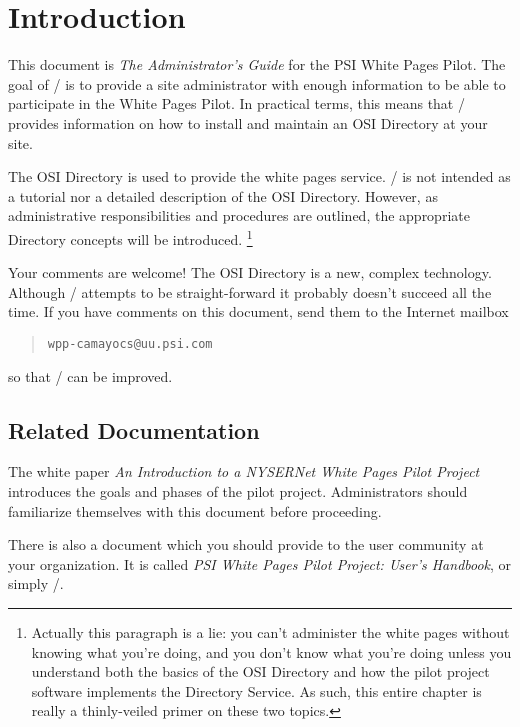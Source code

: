 
\chapter	{Introduction}
This document is {\em The Administrator's Guide\/} for the
PSI White Pages Pilot.
The goal of \theguide/ is to provide a site administrator
with enough information to be able to participate in the White Pages
Pilot.
In practical terms,
this means that \theguide/ provides information on how
to install and maintain an OSI Directory at your site.

The OSI Directory is used to provide the white pages service.
\theguide/ is not intended as a tutorial nor a detailed description
of the OSI Directory.
However, as administrative responsibilities and procedures are
outlined,
the appropriate Directory concepts will be introduced.%
\footnote{Actually this paragraph is a lie:
you can't administer the white pages without knowing what you're
doing,
and you don't know what you're doing unless you understand both
the basics of the OSI Directory and how the pilot project software
implements the Directory Service.
As such,
this entire chapter is really a thinly-veiled primer on these
two topics.}

Your comments are welcome!
The OSI Directory is a new, complex technology.
Although \theguide/ attempts to be straight-forward it probably doesn't
succeed all the time.
If you have comments on this document, send them to the Internet
mailbox
\begin{quote}\begin{verbatim}
wpp-camayocs@uu.psi.com
\end{verbatim}\end{quote}
so that \theguide/ can be improved.

\newpage

\section*	{Related Documentation}
The white paper
{\em An Introduction to a NYSERNet White Pages Pilot Project\/}
introduces the goals and phases of the pilot project.
Administrators should familiarize themselves with this document
before proceeding.

There is also a document which you should provide to the user community at
your organization.
It is called
{\em PSI White Pages Pilot Project: User's Handbook},
or simply \thebook/.

